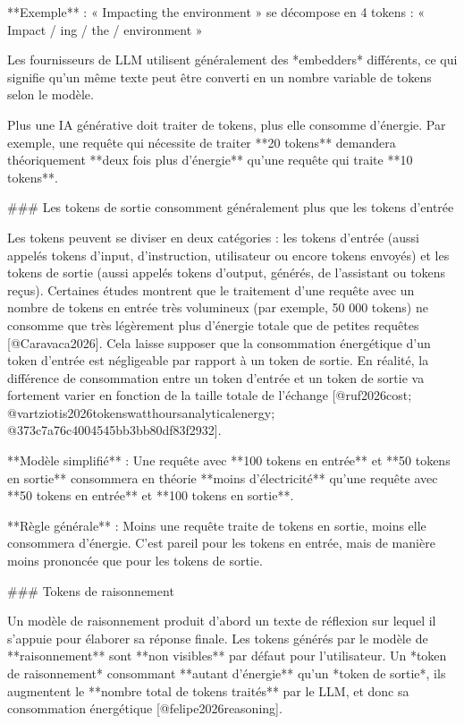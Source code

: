 **Exemple** :
« Impacting the environment » se décompose en 4 tokens : « Impact / ing / the / environment »

Les fournisseurs de LLM utilisent généralement des *embedders* différents, ce qui signifie qu'un même texte peut être converti en un nombre variable de tokens selon le modèle.

Plus une IA générative doit traiter de tokens, plus elle consomme d'énergie. Par exemple, une requête qui nécessite de traiter **20 tokens** demandera théoriquement **deux fois plus d'énergie** qu'une requête qui traite **10 tokens**.

### Les tokens de sortie consomment généralement plus que les tokens d'entrée

Les tokens peuvent se diviser en deux catégories : les tokens d'entrée (aussi appelés tokens d'input, d'instruction, utilisateur ou encore tokens envoyés) et les tokens de sortie (aussi appelés tokens d'output, générés, de l'assistant ou tokens reçus).
Certaines études montrent que le traitement d'une requête avec un nombre de tokens en entrée très volumineux (par exemple, 50 000 tokens) ne consomme que très légèrement plus d'énergie totale que de petites requêtes [@Caravaca2026]. Cela laisse supposer que la consommation énergétique d'un token d'entrée est négligeable par rapport à un token de sortie.
En réalité, la différence de consommation entre un token d'entrée et un token de sortie va fortement varier en fonction de la taille totale de l'échange [@ruf2026cost; @vartziotis2026tokenswatthoursanalyticalenergy; @373c7a76c4004545bb3bb80df83f2932].

**Modèle simplifié** :
Une requête avec **100 tokens en entrée** et **50 tokens en sortie** consommera en théorie **moins d'électricité** qu'une requête avec **50 tokens en entrée** et **100 tokens en sortie**.

**Règle générale** : Moins une requête traite de tokens en sortie, moins elle consommera d'énergie. C'est pareil pour les tokens en entrée, mais de manière moins prononcée que pour les tokens de sortie.

### Tokens de raisonnement

Un modèle de raisonnement produit d'abord un texte de réflexion sur lequel il s'appuie pour élaborer sa réponse finale.
Les tokens générés par le modèle de **raisonnement** sont **non visibles** par défaut pour l'utilisateur. Un *token de raisonnement* consommant **autant d'énergie** qu'un *token de sortie*, ils augmentent le **nombre total de tokens traités** par le LLM, et donc sa consommation énergétique [@felipe2026reasoning].

